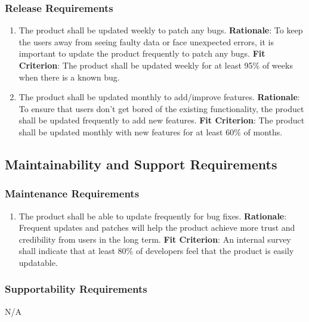 \documentclass[12pt, titlepage]{article}
\begin{document}
\subsubsection{Release Requirements}
\begin{enumerate}[nfr]
    \item The product shall be updated weekly to patch any bugs.
    \newline \textbf{Rationale}: To keep the users away from seeing faulty data or face unexpected errors, it is important to update the product frequently to patch any bugs.
    \newline \textbf{Fit Criterion}: The product shall be updated weekly for at least 95\% of weeks when there is a known bug.
    \item The product shall be updated monthly to add/improve features.
    \newline \textbf{Rationale}: To ensure that users don't get bored of the existing functionality, the product shall be updated frequently to add new features.
    \newline \textbf{Fit Criterion}: The product shall be updated monthly with new features for at least 60\% of months.
\end{enumerate}

\subsection{Maintainability and Support Requirements}
\subsubsection{Maintenance Requirements}
\begin{enumerate}[nfr]
    \item The product shall be able to update frequently for bug fixes.
    \newline \textbf{Rationale}: Frequent updates and patches will help the product achieve more trust and credibility from users in the long term.
    \newline \textbf{Fit Criterion}: An internal survey shall indicate that at least 80\% of developers feel that the product is easily updatable.
\end{enumerate}

\subsubsection{Supportability Requirements}
N/A
\end{document}
